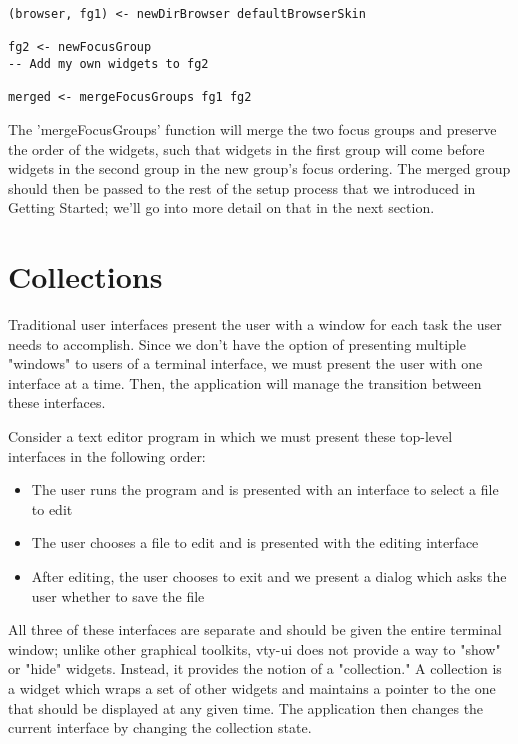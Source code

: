 \documentclass[11pt, letterpaper, oneside, titlepage]{article}
\begin{document}
\begin{verbatim}
(browser, fg1) <- newDirBrowser defaultBrowserSkin

fg2 <- newFocusGroup
-- Add my own widgets to fg2

merged <- mergeFocusGroups fg1 fg2
\end{verbatim}

The 'mergeFocusGroups' function will merge the two focus groups and
preserve the order of the widgets, such that widgets in the first group
will come before widgets in the second group in the new group's focus
ordering.  The merged group should then be passed to the rest of the
setup process that we introduced in Getting Started; we'll go into more
detail on that in the next section.

\section{Collections}

Traditional user interfaces present the user with a window for each task
the user needs to accomplish.  Since we don't have the option of
presenting multiple "windows" to users of a terminal interface, we must
present the user with one interface at a time.  Then, the application
will manage the transition between these interfaces.

Consider a text editor program in which we must present these top-level
interfaces in the following order:

\begin{itemize}
\item The user runs the program and is presented with an interface to
      select a file to edit
\item The user chooses a file to edit and is presented with the
      editing interface
\item After editing, the user chooses to exit and we present a dialog
      which asks the user whether to save the file
\end{itemize}

All three of these interfaces are separate and should be given the
entire terminal window; unlike other graphical toolkits, vty-ui does not
provide a way to "show" or "hide" widgets.  Instead, it provides the
notion of a "collection."  A collection is a widget which wraps a set of
other widgets and maintains a pointer to the one that should be
displayed at any given time.  The application then changes the current
interface by changing the collection state.
\end{document}
